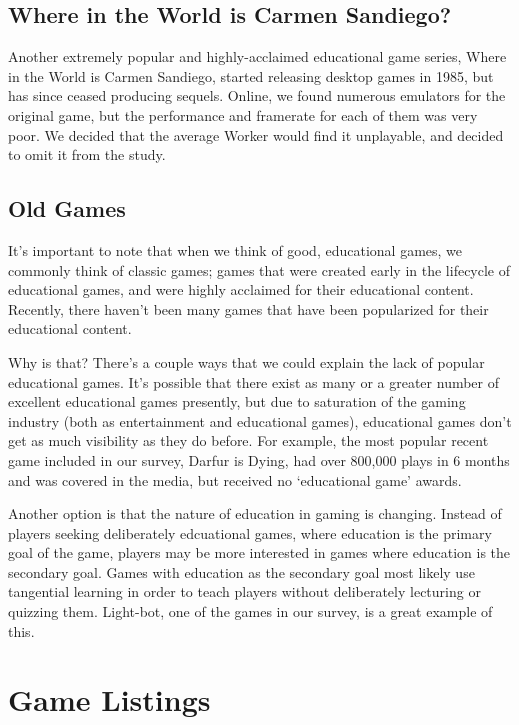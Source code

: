 \documentclass[12pt]{report}
\begin{document}
		\subsection{Where in the World is Carmen Sandiego?}
			Another extremely popular and highly-acclaimed educational game series, Where in the World is Carmen Sandiego, started releasing desktop games in 1985, but has since ceased producing sequels. Online, we found numerous emulators for the original game, but the performance and framerate for each of them was very poor. We decided that the average Worker would find it unplayable, and decided to omit it from the study.

		\subsection{Old Games}
			It's important to note that when we think of good, educational games, we commonly think of classic games; games that were created early in the lifecycle of educational games, and were highly acclaimed for their educational content. Recently, there haven't been many games that have been popularized for their educational content.

			Why is that? There's a couple ways that we could explain the lack of popular educational games. It's possible that there exist as many or a greater number of excellent educational games presently, but due to saturation of the gaming industry (both as entertainment and educational games), educational games don't get as much visibility as they do before. For example, the most popular recent game included in our survey, Darfur is Dying, had over 800,000 plays in 6 months and was covered in the media, but received no `educational game' awards.

			Another option is that the nature of education in gaming is changing. Instead of players seeking deliberately edcuational games, where education is the primary goal of the game, players may be more interested in games where education is the secondary goal. Games with education as the secondary goal most likely use tangential learning in order to teach players without deliberately lecturing or quizzing them. Light-bot, one of the games in our survey, is a great example of this.
	\section{Game Listings}




\end{document}
